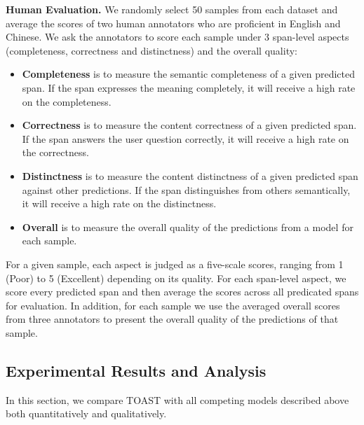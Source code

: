 \documentclass[a4paper]{cas-sc}
\newcommand{\1}[1]{\mathds{1}\left[#1\right]}
\begin{document}
\textbf{Human Evaluation.} We randomly select 50 samples from each dataset and average the scores of two human annotators who are proficient in English and Chinese.
We ask the annotators to score each sample under 3 span-level aspects (completeness, correctness and distinctness) and the overall quality:
\begin{itemize}
	\item \textbf{Completeness} is to measure the semantic completeness of a given predicted span. If the span expresses the meaning completely, it will receive a high rate on the completeness.
	\item \textbf{Correctness} is to measure the content correctness of a given predicted span. If the span answers the user question correctly, it will receive a high rate on the correctness.
	\item \textbf{Distinctness} is to measure the content distinctness of a given predicted span against other predictions. If the span distinguishes from others semantically, it will receive a high rate on the distinctness. 
	\item \textbf{Overall} is to measure the overall quality of the predictions from a model for each sample.
\end{itemize}
For a given sample, each aspect is judged as a five-scale scores, 
ranging from 1 (Poor) to 5 (Excellent) depending on its quality.
For each span-level aspect, we score every predicted span and then average the scores across all predicated spans for evaluation.
In addition, for each sample we use the averaged overall scores from three annotators to present the overall quality of the predictions of that sample.


\subsection{Experimental Results and Analysis}
\label{sec:evaluation}
In this section, we compare TOAST with all competing models described above both quantitatively and qualitatively.
\end{document}

